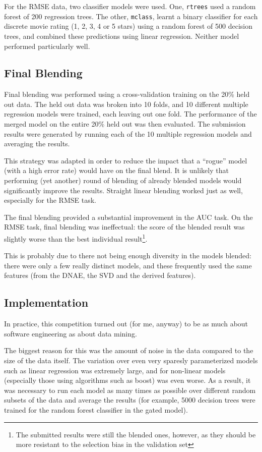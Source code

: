 \documentclass{article}
\begin{document}
For the RMSE data, two classifier models were used.  One, \texttt{rtrees} used a random forest of 200 regression trees.  The other, \texttt{mclass}, learnt a binary classifier for each discrete movie rating (1, 2, 3, 4 or 5 stars) using a random forest of 500 decision trees, and combined these predictions using linear regression.  Neither model performed particularly well.


\subsection{Final Blending}

Final blending was performed using a cross-validation training on the 20\% held out data.  The held out data was broken into 10 folds, and 10 different multiple regression models were trained, each leaving out one fold.  The performance of the merged model on the entire 20\% held out was then evaluated.  The submission results were generated by running each of the 10 multiple regression models and averaging the results.

This strategy was adapted in order to reduce the impact that a ``rogue'' model (with a high error rate) would have on the final blend.  It is unlikely that performing (yet another) round of blending of already blended models would significantly improve the results.  Straight linear blending worked just as well, especially for the RMSE task.

The final blending provided a substantial improvement in the AUC task.  On the RMSE task, final blending was ineffectual: the score of the blended result was slightly worse than the best individual result\footnote{The submitted results were still the blended ones, however, as they should be more resistant to the selection bias in the validation set}.

This is probably due to there not being enough diversity in the models blended: there were only a few really distinct models, and these frequently used the same features (from the DNAE, the SVD and the derived features).

\subsection{Implementation}

In practice, this competition turned out (for me, anyway) to be as much about software engineering as about data mining.

The biggest reason for this was the amount of noise in the data compared to the size of the data itself.  The variation over even very sparesly parameterized models such as linear regression was extremely large, and for non-linear models (especially those using algorithms such as boost) was even worse.  As a result, it was necessary to run each model as many times as possible over different random subsets of the data and average the results (for example, 5000 decision trees were trained for the random forest classifier in the gated model).
\end{document}
